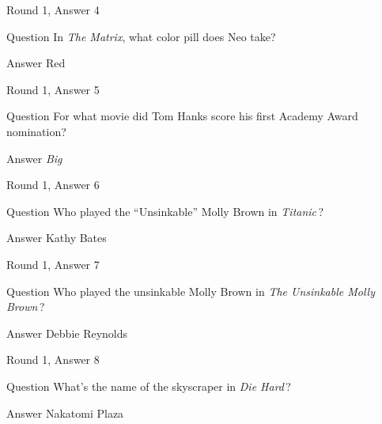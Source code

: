 \documentclass[11pt]{beamer}
\begin{document}
\begin{frame}[t]{Round 1, Answer 4}
\vspace{2em}
\begin{block}{Question}
In \emph{The Matrix}, what color pill does Neo take?
\end{block}
\pause{}
\begin{block}{Answer}
Red
\end{block}
\end{frame}
    

\begin{frame}[t]{Round 1, Answer 5}
\vspace{2em}
\begin{block}{Question}
For what movie did Tom Hanks score his first Academy Award nomination?
\end{block}
\pause{}
\begin{block}{Answer}
\emph{Big}
\end{block}
\end{frame}
    

\begin{frame}[t]{Round 1, Answer 6}
\vspace{2em}
\begin{block}{Question}
Who played the ``Unsinkable'' Molly Brown in \emph{Titanic}\,?
\end{block}
\pause{}
\begin{block}{Answer}
Kathy Bates
\end{block}
\end{frame}
    

\begin{frame}[t]{Round 1, Answer 7}
\vspace{2em}
\begin{block}{Question}
Who played the unsinkable Molly Brown in \emph{The Unsinkable Molly Brown}\,?
\end{block}
\pause{}
\begin{block}{Answer}
Debbie Reynolds
\end{block}
\end{frame}
    

\begin{frame}[t]{Round 1, Answer 8}
\vspace{2em}
\begin{block}{Question}
What's the name of the skyscraper in \emph{Die Hard}\,?
\end{block}
\pause{}
\begin{block}{Answer}
Nakatomi Plaza
\end{block}
\end{frame}
    
\end{document}
